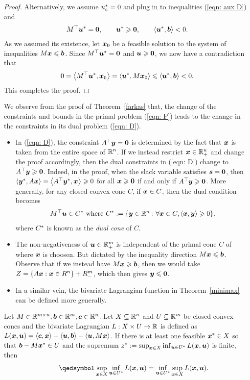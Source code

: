 \begin{proof}
Alternatively, we assume $u_c^\ast = 0$ and plug in to inequalities (\ref{eqn: aux D}) and
$$  M^\top {\boldsymbol u}^\ast =  \boldsymbol0, \qquad {\boldsymbol u}^\ast \geqslant \boldsymbol0,\qquad \left\langle{\boldsymbol u}^\ast, {\boldsymbol b}\right\rangle < 0. $$
As we assumed its existence, let ${\boldsymbol x}_0$ be a feasible solution to the system of inequalities $M{\boldsymbol x}\leqslant{\boldsymbol b}$. Since $M^\top {\boldsymbol u}^\ast =  \boldsymbol0$ and ${\boldsymbol u}\geqslant\boldsymbol0$, we now have a contradiction that 
$$ 0 = \left\langle M^\top{\boldsymbol u}^\ast, {\boldsymbol x}_0\right\rangle = \left\langle{\boldsymbol u}^\ast, M {\boldsymbol x}_0\right\rangle \leqslant \left\langle{\boldsymbol u}^\ast, {\boldsymbol b}\right\rangle < 0. $$
This completes the proof. 
\end{proof}



We observe from the proof of Theorem~\ref{farkas} that, the change of the constraints and bounds in the primal problem (\ref{eqn: P}) leads to the change in the constraints in its dual problem (\ref{eqn: D}). 
\begin{itemize}
\item In (\ref{eqn: D}), the constraint $A^\top {\boldsymbol y} = \boldsymbol0$ is determined by the fact that ${\boldsymbol x}$ is taken from the entire space of $\mathbb R^n$. If we instead restrict ${\boldsymbol x}\in\mathbb R^n_+$ and change the proof accordingly, then the dual constraints in (\ref{eqn: D}) change to $A^\top {\boldsymbol y} \geqslant \boldsymbol0$. Indeed, in the proof, when the slack variable satisfies ${\boldsymbol s} = \boldsymbol0$, then $\left\langle{\boldsymbol y}^\ast, A{\boldsymbol x}\right\rangle = \left\langle A^\top {\boldsymbol y}^\ast, {\boldsymbol x}\right\rangle\geqslant 0$ for all ${\boldsymbol x}\geqslant \boldsymbol0$ if and only if $A^\top {\boldsymbol y}\geqslant \boldsymbol0$. More generally, for any closed convex cone $C$, if ${\boldsymbol x}\in C$, then the dual condition becomes 
\[ M^\top {\boldsymbol u}\in C^\ast\text{ where } C^\ast := \{{\boldsymbol y} \in\mathbb R^n: \forall {\boldsymbol x}\in C, \left\langle{\boldsymbol x}, {\boldsymbol y}\right\rangle\geqslant 0\}. \]
where $C^\ast$ is known as the {\em dual cone} of $C$. 

\item The non-negativeness of ${\boldsymbol u}\in\mathbb R^m_+$ is independent of the primal cone $C$ of where ${\boldsymbol x}$ is choosen. But dictated by the inequality direction $M {\boldsymbol x}\leqslant {\boldsymbol b}$. Observe that if we instead have $M{\boldsymbol x}\geqslant {\boldsymbol b}$, then we would take $Z = \{A{\boldsymbol x} : {\boldsymbol x}\in R^n\} + R^m_-$, which then gives ${\boldsymbol y}\leqslant\boldsymbol0$.  
\item In a similar vein, the bivariate Lagrangian function in Theorem~\ref{minimax} can be defined more generally.
\end{itemize}
\begin{theorem}\label{conic minimax}
Let $M\in \mathbb R^{m\times n}, {\boldsymbol b}\in\mathbb R^m, {\boldsymbol c}\in\mathbb R^n$. Let $X\subseteq \mathbb R^n$ and $U\subseteq\mathbb R^m$ be closed convex cones and the bivariate Lagrangian $L: X\times U\to \mathbb R$ is defined as $L({\boldsymbol x}, {\boldsymbol u})  =  \left\langle{\boldsymbol c}, {\boldsymbol x}\right\rangle +  \left\langle{\boldsymbol u}, {\boldsymbol b}\right\rangle-\left\langle{\boldsymbol u}, M\boldsymbol x\right\rangle$. If there is at least one feasible ${\boldsymbol x}^\ast\in X$ so that ${\boldsymbol b} - M{\boldsymbol x}^\ast \in U $ and the supremum $z^* :=  \sup_{{\boldsymbol x}\in X} \inf_{{\boldsymbol u}\in U^\ast} L(\boldsymbol x, {\boldsymbol u})$ is finite, then 
\begin{equation} \tag*{\qedsymbol} \sup_{\bmx\in X} \inf_{\bmu\in U\rast} L(\bm x, \bmu) =  \inf_{\bmu\in U\rast} \sup_{\bmx\in X} L(\bm x, \bmu). \end{equation}
\end{theorem}  

